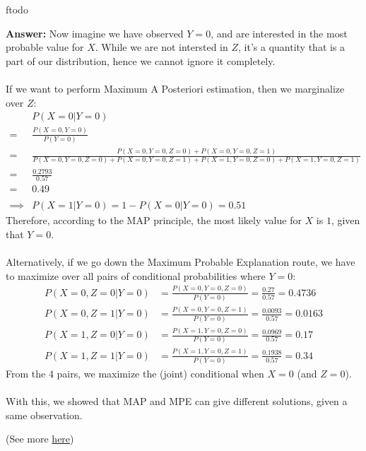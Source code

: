ƒtodo\documentclass{article}
\newenvironment{QandA}{\begin{enumerate}[label=\arabic*.]}{\end{enumerate}}
\newenvironment{InnerQandA}{\begin{enumerate}[label=\roman*.]}{\end{enumerate}}
\newenvironment{answer}{\par\normalfont \textbf{Answer:}}{}
\newcommand{\g}{\vert}
\begin{document}
\begin{QandA}
\begin{InnerQandA}
\begin{answer}
            Now imagine we have observed $Y = 0$, and are interested in the most probable value for $X$. While we are not intersted in $Z$, it's a quantity that is a part of our distribution, hence we cannot ignore it completely. \\\\
            If we want to perform Maximum A Posteriori estimation, then we marginalize over $Z$:
            \begin{align*}
                &P(X = 0 \g Y = 0) \\
                = &\frac{P(X = 0, Y = 0)}{P(Y = 0)} \\
                = &\frac{P(X=0, Y=0, Z=0) + P(X = 0, Y = 0, Z = 1)}{P(X = 0, Y = 0, Z = 0) + P(X = 0, Y = 0, Z = 1) + P(X = 1, Y = 0, Z = 0) + P(X = 1, Y = 0, Z = 1)} \\
                = &\frac{0.2793}{0.57} \\
                = &0.49 \\\\
                \implies &P(X=1 \g Y=0) = 1 - P(X = 0 \g Y=0) = 0.51
            \end{align*}
            Therefore, according to the MAP principle, the most likely value for $X$ is $1$, given that $Y = 0$. \\\\
            Alternatively, if we go down the Maximum Probable Explanation route, we have to maximize over all pairs of conditional probabilities where $Y = 0$:
            \begin{align*}
                P(X = 0, Z = 0 \g Y = 0) &= \frac{P(X = 0, Y=0, Z=0)}{P(Y=0)} = \frac{0.27}{0.57} = 0.4736 \\
                P(X = 0, Z = 1 \g Y = 0) &= \frac{P(X = 0, Y=0, Z=1)}{P(Y=0)} = \frac{0.0093}{0.57} = 0.0163 \\
                P(X = 1, Z = 0 \g Y = 0) &= \frac{P(X = 1, Y=0, Z=0)}{P(Y=0)} = \frac{0.0969}{0.57} = 0.17 \\
                P(X = 1, Z = 1 \g Y = 0) &= \frac{P(X = 1, Y=0, Z=1)}{P(Y=0)} = \frac{0.1938}{0.57} = 0.34
            \end{align*}
            From the 4 pairs, we maximize the (joint) conditional when $X=0$ (and $Z=0$).  \\\\
            With this, we showed that MAP and MPE can give different solutions, given a same observation.

        
            (See more \href{https://www.quora.com/What-are-the-cases-in-which-Most-Probable-Explanation-MPE-tasks-do-not-generalize-to-Maximum-A-Posteriori-MAP-task}{here})
        \end{answer}
    \end{InnerQandA}


\end{QandA}
\end{document}
